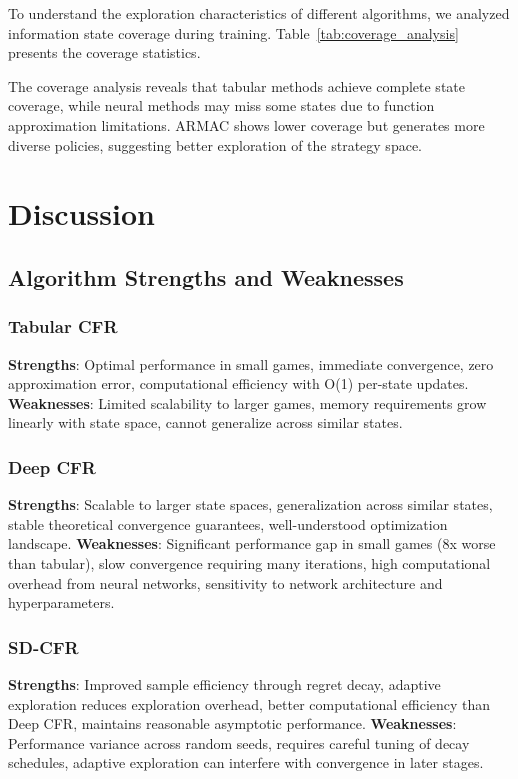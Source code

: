 \documentclass{icml2024}
\begin{document}
To understand the exploration characteristics of different algorithms, we analyzed information state coverage during training. Table~\ref{tab:coverage_analysis} presents the coverage statistics.

The coverage analysis reveals that tabular methods achieve complete state coverage, while neural methods may miss some states due to function approximation limitations. ARMAC shows lower coverage but generates more diverse policies, suggesting better exploration of the strategy space.

\section{Discussion}

\subsection{Algorithm Strengths and Weaknesses}

\subsubsection{Tabular CFR}
\textbf{Strengths}: Optimal performance in small games, immediate convergence, zero approximation error, computational efficiency with O(1) per-state updates.
\textbf{Weaknesses}: Limited scalability to larger games, memory requirements grow linearly with state space, cannot generalize across similar states.

\subsubsection{Deep CFR}
\textbf{Strengths}: Scalable to larger state spaces, generalization across similar states, stable theoretical convergence guarantees, well-understood optimization landscape.
\textbf{Weaknesses}: Significant performance gap in small games (8x worse than tabular), slow convergence requiring many iterations, high computational overhead from neural networks, sensitivity to network architecture and hyperparameters.

\subsubsection{SD-CFR}
\textbf{Strengths}: Improved sample efficiency through regret decay, adaptive exploration reduces exploration overhead, better computational efficiency than Deep CFR, maintains reasonable asymptotic performance.
\textbf{Weaknesses}: Performance variance across random seeds, requires careful tuning of decay schedules, adaptive exploration can interfere with convergence in later stages.
\end{document}
